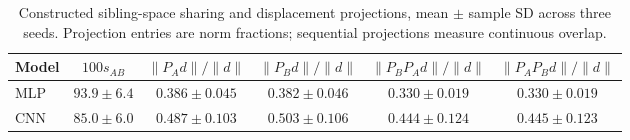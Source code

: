 \begin{table}[!htbp]\centering
\caption{Constructed sibling-space sharing and displacement projections, mean $\pm$ sample SD across three seeds. Projection entries are norm fractions; sequential projections measure continuous overlap.}
\label{tab:lmc-constructed-sharing}
\small\setlength{\tabcolsep}{4pt}
\begin{tabular}{lccccc}\toprule
Model & $100s_{AB}$ & $\|P_Ad\|/\|d\|$ & $\|P_Bd\|/\|d\|$ & $\|P_BP_Ad\|/\|d\|$ & $\|P_AP_Bd\|/\|d\|$\\\midrule
MLP & $93.9 \pm 6.4$ & $0.386 \pm 0.045$ & $0.382 \pm 0.046$ & $0.330 \pm 0.019$ & $0.330 \pm 0.019$\\
CNN & $85.0 \pm 6.0$ & $0.487 \pm 0.103$ & $0.503 \pm 0.106$ & $0.444 \pm 0.124$ & $0.445 \pm 0.123$\\\bottomrule\end{tabular}\end{table}
